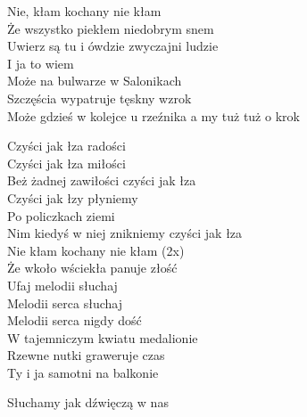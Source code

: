 \begin{text}
    Nie, kłam kochany nie kłam\\
    Że wszystko piekłem niedobrym snem\\
    Uwierz są tu i ówdzie zwyczajni ludzie\\
    I ja to wiem\\
    Może na bulwarze w Salonikach\\
    Szczęścia wypatruje tęskny wzrok\\
    Może gdzieś w kolejce u rzeźnika a my tuż tuż o krok

    Czyści jak łza radości\\
    Czyści jak łza miłości\\
    Beż żadnej zawiłości czyści jak łza\\
    Czyści jak łzy płyniemy\\
    Po policzkach ziemi\\
    Nim kiedyś w niej znikniemy czyści jak łza\\

    Nie kłam kochany nie kłam (2x)\\
    Że wkoło wściekła panuje złość\\
    Ufaj melodii słuchaj\\
    Melodii serca słuchaj\\
    Melodii serca nigdy dość\\
    W tajemniczym kwiatu medalionie\\
    Rzewne nutki graweruje czas\\
    Ty i ja samotni na balkonie

    Słuchamy jak dźwięczą w nas
\end{text}
\begin{chord}

\end{chord}